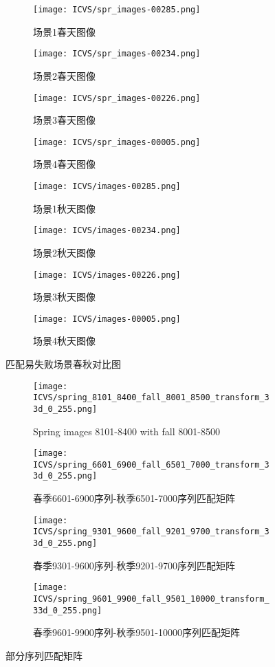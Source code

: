 \begin{figure}[htbp]
 \centering
 \begin{subfigure}[h]{0.23\textwidth} 
  \texttt{[image: ICVS/spr\_images-00285.png]}
  \caption{场景1春天图像}
  \label{fig:RainNight}
 \end{subfigure}
 \begin{subfigure}[h]{0.23\textwidth} 
  \texttt{[image: ICVS/spr\_images-00234.png]}
  \caption{场景2春天图像}
 \end{subfigure}
 \begin{subfigure}[h]{0.23\textwidth} 
  \caption{场景3春天图像}
  \texttt{[image: ICVS/spr\_images-00226.png]}
 \end{subfigure}
 \begin{subfigure}[h]{0.23\textwidth} 
  \texttt{[image: ICVS/spr\_images-00005.png]}
  \caption{场景4春天图像}
\end{subfigure}
 \begin{subfigure}[h]{0.23\textwidth} 
  \texttt{[image: ICVS/images-00285.png]}
  \caption{场景1秋天图像}
 \end{subfigure}
 \begin{subfigure}[h]{0.23\textwidth} 
  \caption{场景2秋天图像}
  \texttt{[image: ICVS/images-00234.png]}
\end{subfigure}
 \begin{subfigure}[h]{0.23\textwidth} 
    \texttt{[image: ICVS/images-00226.png]}
    \caption{场景3秋天图像}
  \end{subfigure}
 \begin{subfigure}[h]{0.23\textwidth} 
 \texttt{[image: ICVS/images-00005.png]}
 \caption{场景4秋天图像}
 \end{subfigure}
 \caption{匹配易失败场景春秋对比图}
\end{figure}

\begin{figure*}[h]
 \centering
 \begin{subfigure}[h]{0.23\textwidth}
 \texttt{[image: ICVS/spring\_8101\_8400\_fall\_8001\_8500\_transform\_33d\_0\_255.png]}
 \caption{Spring images 8101-8400 with fall 8001-8500}
 \end{subfigure}
 \begin{subfigure}[h]{0.23\textwidth}
 \texttt{[image: ICVS/spring\_6601\_6900\_fall\_6501\_7000\_transform\_33d\_0\_255.png]}
 \caption{春季6601-6900序列-秋季6501-7000序列匹配矩阵}
 \end{subfigure}
 \begin{subfigure}[h]{0.23\textwidth}
 \texttt{[image: ICVS/spring\_9301\_9600\_fall\_9201\_9700\_transform\_33d\_0\_255.png]}
 \caption{春季9301-9600序列-秋季9201-9700序列匹配矩阵}
 \end{subfigure}
 \begin{subfigure}[h]{0.23\textwidth}
 \texttt{[image: ICVS/spring\_9601\_9900\_fall\_9501\_10000\_transform\_33d\_0\_255.png]}
 \caption{春季9601-9900序列-秋季9501-10000序列匹配矩阵}
 \end{subfigure}
 \caption{部分序列匹配矩阵}
\end{figure*}

